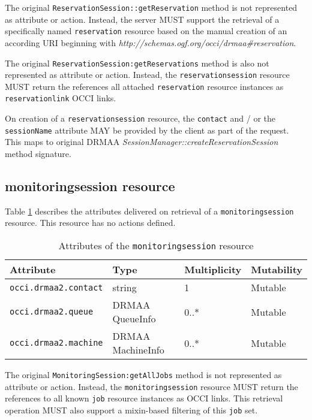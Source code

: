 \documentclass[10pt]{article}
\newcommand{\h}[1]{\lstinline|#1|}
\begin{document}
The original \h{ReservationSession::getReservation} method is not represented as attribute or action. Instead, the server MUST support the retrieval of a specifically named \h{reservation} resource based on the manual creation of an according URI beginning with \emph{http://schemas.ogf.org/occi/drmaa\#reservation}. 

The original \h{ReservationSession:getReservations} method is also not represented as attribute or action. Instead, the \h{reservationsession} resource MUST return the references all attached \h{reservation} resource instances as \h{reservationlink} OCCI links. 

On creation of a \h{reservationsession} resource, the \h{contact} and / or the \h{sessionName} attribute MAY be provided by the client as part of the request. This maps to original DRMAA \emph{SessionManager::createReservationSession} method signature.


\subsection{monitoringsession resource}


Table \ref{tab:monitoringsessionattributes} describes the attributes delivered on retrieval of a \h{monitoringsession} resource. This resource has no actions defined.

\begin{table}[ht]
\centering
\begin{tabularx}{\textwidth}{|l|X|X|X|}
\hline
Attribute    & Type  & Multiplicity & Mutability \\
\hline
\h{occi.drmaa2.contact}  & string            & 1            & Mutable    \\ 
\h{occi.drmaa2.queue}    & DRMAA QueueInfo   & 0..*         & Mutable    \\ 
\h{occi.drmaa2.machine}  & DRMAA MachineInfo & 0..*         & Mutable    \\ 
\hline
\end{tabularx}
\caption{Attributes of the \h{monitoringsession} resource}
\label{tab:monitoringsessionattributes}
\end{table}

The original \h{MonitoringSession:getAllJobs} method is not represented as attribute or action. Instead, the \h{monitoringsession} resource MUST return the references to all known \h{job} resource instances as OCCI links. This retrieval operation MUST also support a mixin-based filtering of this \h{job} set. 
\end{document}
